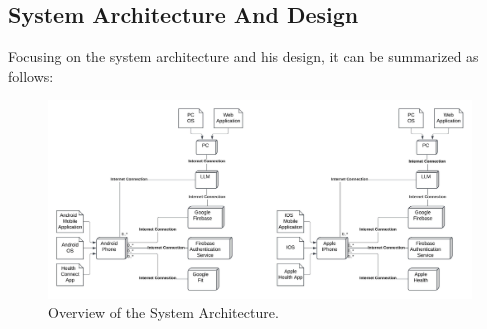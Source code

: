 \subsection{System Architecture And Design}
Focusing on the system architecture and his design, it can be summarized as follows:
\begin{figure}
    \includegraphics[width=1.0\linewidth]{./images/system_architecture.jpeg}
    \caption{Overview of the System Architecture.}
    \label{fig:systemArchitecture}
\end{figure}

